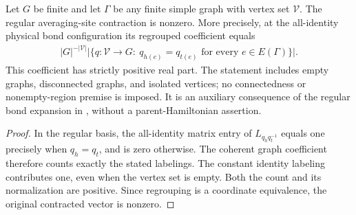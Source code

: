 \begin{lemma}%
    \label{thm:peps_graph_regular_averaging_nonzero}
    \leanok
    Let $G$ be finite and let $\Gamma$ be any finite simple graph with vertex
    set $\mathcal V$. The regular averaging-site contraction is nonzero.
    More precisely, at the all-identity physical bond configuration its
    regrouped coefficient equals
    \begin{align}
        |G|^{-|\mathcal V|}
        \bigl|\{q:\mathcal V\to G:\ q_{h(e)}=q_{t(e)}
        \text{ for every }e\in E(\Gamma)\}\bigr|.
    \end{align}
    This coefficient has strictly positive real part. The statement includes
    empty graphs, disconnected graphs, and isolated vertices; no connectedness
    or nonempty-region premise is imposed. It is an auxiliary consequence of
    the regular bond expansion in \cite[Section~7]{Schuch2010PEPS},
    without a parent-Hamiltonian assertion.
\end{lemma}

\begin{proof}\leanok
    In the regular basis, the all-identity matrix entry of
    $L_{q_hq_t^{-1}}$ equals one precisely when $q_h=q_t$, and is zero otherwise.
    The coherent graph coefficient therefore counts exactly the stated
    labelings. The constant identity labeling contributes one, even when the
    vertex set is empty. Both the count and its normalization are positive.
    Since regrouping is a coordinate equivalence, the original contracted
    vector is nonzero.
\end{proof}
